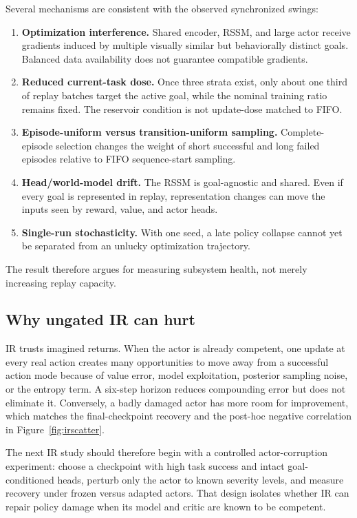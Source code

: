 \documentclass[10pt]{article}
\begin{document}
Several mechanisms are consistent with the observed synchronized swings:
\begin{enumerate}
  \item \textbf{Optimization interference.} Shared encoder, RSSM, and large actor receive gradients induced by multiple visually similar but behaviorally distinct goals. Balanced data availability does not guarantee compatible gradients.
  \item \textbf{Reduced current-task dose.} Once three strata exist, only about one third of replay batches target the active goal, while the nominal training ratio remains fixed. The reservoir condition is not update-dose matched to FIFO.
  \item \textbf{Episode-uniform versus transition-uniform sampling.} Complete-episode selection changes the weight of short successful and long failed episodes relative to FIFO sequence-start sampling.
  \item \textbf{Head/world-model drift.} The RSSM is goal-agnostic and shared. Even if every goal is represented in replay, representation changes can move the inputs seen by reward, value, and actor heads.
  \item \textbf{Single-run stochasticity.} With one seed, a late policy collapse cannot yet be separated from an unlucky optimization trajectory.
\end{enumerate}

The result therefore argues for measuring subsystem health, not merely increasing replay capacity.

\subsection{Why ungated IR can hurt}

IR trusts imagined returns. When the actor is already competent, one update at every real action creates many opportunities to move away from a successful action mode because of value error, model exploitation, posterior sampling noise, or the entropy term. A six-step horizon reduces compounding error but does not eliminate it. Conversely, a badly damaged actor has more room for improvement, which matches the final-checkpoint recovery and the post-hoc negative correlation in Figure~\ref{fig:irscatter}.

The next IR study should therefore begin with a controlled actor-corruption experiment: choose a checkpoint with high task success and intact goal-conditioned heads, perturb only the actor to known severity levels, and measure recovery under frozen versus adapted actors. That design isolates whether IR can repair policy damage when its model and critic are known to be competent.
\end{document}
